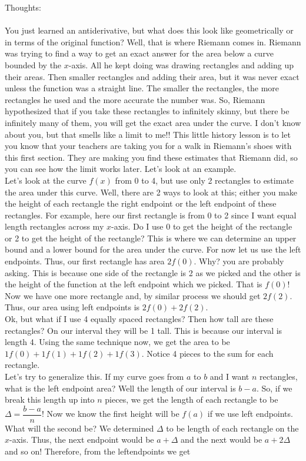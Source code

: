 \documentclass[10pt]{article}
\theoremstyle{Theorem}
\theoremstyle{definition}
\theoremstyle{remark}
\theoremstyle{custom}
\begin{document}
\thispagestyle{firststyle}
\pagestyle{plain}

Thoughts:\\\\
You just learned an antiderivative, but what does this look like geometrically or in terms of the original function? Well, that is where Riemann comes in. Riemann was trying to find a way to get an exact answer for the area below a curve bounded by the $x$-axis. All he kept doing was drawing rectangles and adding up their areas. Then smaller rectangles and adding their area, but it was never exact unless the function was a straight line. The smaller the rectangles, the more rectangles he used and the more accurate the number was. So, Riemann hypothesized that if you take these rectangles to infinitely skinny, but there be infinitely many of them, you will get the exact area under the curve. I don't know about you, but that smells like a limit to me!! This little history lesson is to let you know that your teachers are taking you for a walk in Riemann's shoes with this first section. They are making you find these estimates that Riemann did, so you can see how the limit works later. Let's look at an example.\\
Let's look at the curve $f(x)$ from 0 to 4, but use only 2 rectangles to estimate the area under this curve. Well, there are 2 ways to look at this; either you make the height of each rectangle the right endpoint or the left endpoint of these rectangles. For example, here our first rectangle is from 0 to 2 since I want equal length rectangles across my $x$-axis. Do I use 0 to get the height of the rectangle or 2 to get the height of the rectangle? This is where we can determine an upper bound and a lower bound for the area under the curve. For now let us use the left endpoints. Thus, our first rectangle has area $2f(0)$. Why? you are probably asking. This is because one side of the rectangle is 2 as we picked and the other is the height of the function at the left endpoint which we picked. That is $f(0)$! Now we have one more rectangle and, by similar process we should get $2f(2)$. Thus, our area using left endpoints is $2f(0)+2f(2)$.\\
Ok, but what if I use 4 equally spaced rectangles? Then how tall are these rectangles? On our interval they will be 1 tall. This is because our interval is length 4. Using the same technique now, we get the area to be $1f(0)+1f(1)+1f(2)+1f(3)$. Notice 4 pieces to the sum for each rectangle.\\
Let's try to generalize this. If my curve goes from $a$ to $b$ and I want $n$ rectangles, what is the left endpoint area? Well the length of our interval is $b-a$. So, if we break this length up into $n$ pieces, we get the length of each rectangle to be $\Delta=\dfrac{b-a}{n}$! Now we know the first height will be $f(a)$ if we use left endpoints. What will the second be? We determined $\Delta$ to be length of each rectangle on the $x$-axis. Thus, the next endpoint would be $a+\Delta$ and the next would be $a+2\Delta$ and so on! Therefore, from the leftendpoints we get
\end{document}
